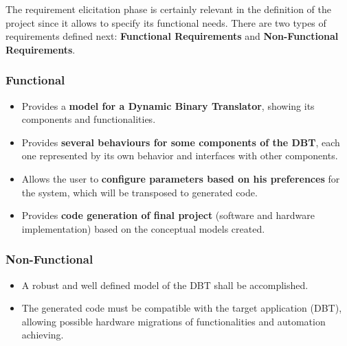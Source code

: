 The requirement elicitation phase is certainly relevant in the definition of the project since it allows to specify its functional needs. There are two types of requirements defined next: \textbf{Functional Requirements} and \textbf{Non-Functional Requirements}. 

\subsubsection{Functional}
\begin{itemize}
\item Provides a \textbf{model for a Dynamic Binary Translator}, showing its components and functionalities.
\item Provides \textbf{several behaviours for some components of the DBT}, each one represented by its own behavior and interfaces with other components. 
\item Allows the user to \textbf{configure parameters based on his preferences} for the system, which will be transposed to generated code.
\item Provides\textbf{ code generation of final project} (software and hardware implementation) based on the conceptual models created.
\end{itemize}

\subsubsection{Non-Functional}
\begin{itemize}
\item A robust and well defined model of the DBT shall be accomplished.
\item The generated code must be compatible with the target application (DBT), allowing possible hardware migrations of functionalities and automation achieving.
\end{itemize}

